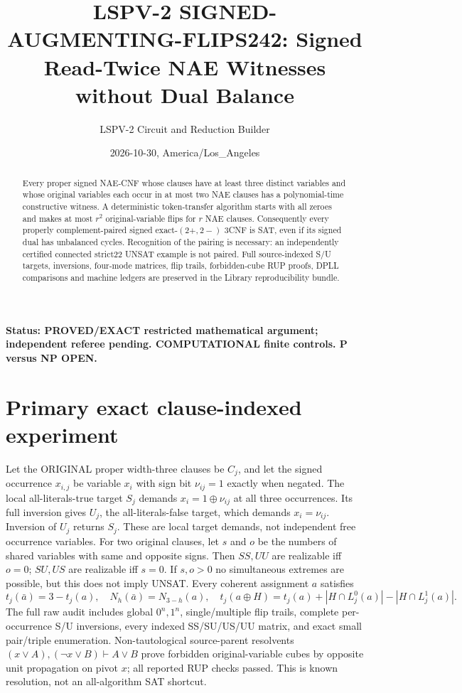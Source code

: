 \documentclass[10pt]{article}
\title{LSPV-2 SIGNED-AUGMENTING-FLIPS242: Signed Read-Twice NAE Witnesses without Dual Balance}
\author{LSPV-2 Circuit and Reduction Builder}
\date{2026-10-30, America/Los\_Angeles}
\begin{document}
\maketitle
\noindent\textbf{Status: PROVED/EXACT restricted mathematical argument; independent referee pending. COMPUTATIONAL finite controls. P versus NP OPEN.}
\begin{abstract}
Every proper signed NAE-CNF whose clauses have at least three distinct variables and whose original variables each occur in at most two NAE clauses has a polynomial-time constructive witness. A deterministic token-transfer algorithm starts with all zeroes and makes at most $r^2$ original-variable flips for $r$ NAE clauses. Consequently every properly complement-paired signed exact-$(2+,2-)$ 3CNF is SAT, even if its signed dual has unbalanced cycles. Recognition of the pairing is necessary: an independently certified connected strict22 UNSAT example is not paired. Full source-indexed S/U targets, inversions, four-mode matrices, flip trails, forbidden-cube RUP proofs, DPLL comparisons and machine ledgers are preserved in the Library reproducibility bundle.
\end{abstract}
\section{Primary exact clause-indexed experiment}
Let the ORIGINAL proper width-three clauses be $C_j$, and let the signed occurrence $x_{i,j}$ be variable $x_i$ with sign bit $\nu_{ij}=1$ exactly when negated. The local all-literals-true target $S_j$ demands $x_i=1\oplus\nu_{ij}$ at all three occurrences. Its full inversion gives $U_j$, the all-literals-false target, which demands $x_i=\nu_{ij}$. Inversion of $U_j$ returns $S_j$. These are local target demands, not independent free occurrence variables. For two original clauses, let $s$ and $o$ be the numbers of shared variables with same and opposite signs. Then $SS,UU$ are realizable iff $o=0$; $SU,US$ are realizable iff $s=0$. If $s,o>0$ no simultaneous extremes are possible, but this does not imply UNSAT. Every coherent assignment $a$ satisfies
\[
t_j(\bar a)=3-t_j(a),\quad N_h(\bar a)=N_{3-h}(a),
\quad t_j(a\oplus H)=t_j(a)+|H\cap L^0_j(a)|-|H\cap L^1_j(a)|.
\]
The full raw audit includes global $0^n,1^n$, single/multiple flip trails, complete per-occurrence S/U inversions, every indexed SS/SU/US/UU matrix, and exact small pair/triple enumeration. Non-tautological source-parent resolvents $(x\vee A),(\neg x\vee B)\vdash A\vee B$ prove forbidden original-variable cubes by opposite unit propagation on pivot $x$; all reported RUP checks passed. This is known resolution, not an all-algorithm SAT shortcut.
\end{document}
